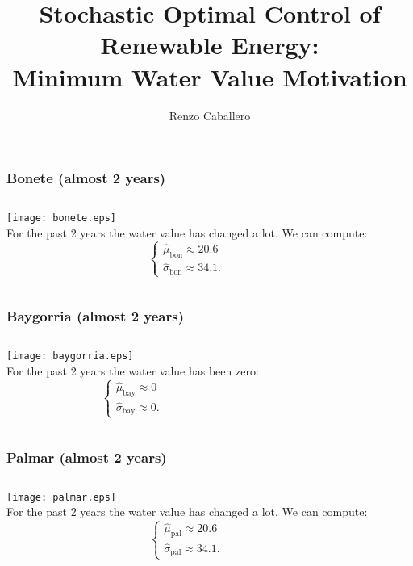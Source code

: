 \documentclass[aspectratio=169]{beamer}
\title[Minimum Water Value]{Stochastic Optimal Control of Renewable Energy:\\
Minimum Water Value Motivation} %
\author{Renzo Caballero} %
\institute[KAUST] %
{renzo.caballerorosas@kaust.edu.sa\\
\quad\\
\medskip
Advisor: Professor Ra\'ul Tempone\\
}
\begin{document}
\begin{frame}
\titlepage %
\end{frame}


\begin{frame}\frametitle{Bonete (almost 2 years)}
\begin{columns}[c]

\texttt{[image: bonete.eps]}\\

For the past 2 years the water value has changed a lot. We can compute:
\begin{equation*}
\begin{cases}
\hat{\mu}_{\text{bon}}\approx20.6\\
\hat{\sigma}_{\text{bon}}\approx34.1.
\end{cases}
\end{equation*}

\end{columns}
\end{frame}


\begin{frame}\frametitle{Baygorria (almost 2 years)}
\begin{columns}[c]

\texttt{[image: baygorria.eps]}\\

For the past 2 years the water value has been zero:
\begin{equation*}
\begin{cases}
\hat{\mu}_{\text{bay}}\approx0\\
\hat{\sigma}_{\text{bay}}\approx0.
\end{cases}
\end{equation*}

\end{columns}
\end{frame}


\begin{frame}\frametitle{Palmar (almost 2 years)}
\begin{columns}[c]

\texttt{[image: palmar.eps]}\\

For the past 2 years the water value has changed a lot. We can compute:
\begin{equation*}
\begin{cases}
\hat{\mu}_{\text{pal}}\approx20.6\\
\hat{\sigma}_{\text{pal}}\approx34.1.
\end{cases}
\end{equation*}

\end{columns}
\end{frame}
\end{document}

